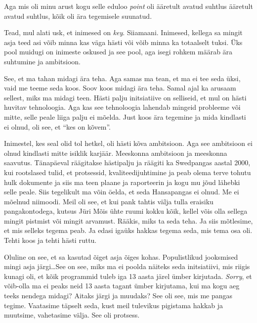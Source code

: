 Aga mis oli minu arust kogu selle eduloo \emph{point} oli ääretult avatud suhtlus ääretult avatud suhtlus, kõik oli  ära tegemisele suunatud. 


Tead, mul alati usk, et inimesed on \emph{key}. Siiamaani. Inimesed, kellega sa mingit asja teed asi võib minna kas väga hästi või võib minna ka totaalselt tuksi. Üks pool muidugi on inimeste oskused ja see pool, aga isegi rohkem määrab ära suhtumine ja ambitsioon. 


See, et ma tahan midagi ära teha. Aga samas ma tean, et ma ei tee seda üksi, vaid me teeme seda koos. Soov koos midagi ära teha. Samal ajal ka arusaam sellest, miks ma midagi teen. Hästi palju initsiatiive on selliseid, et mul on  hästi huvitav tehnoloogia. Aga kas see tehnoloogia lahendab mingeid probleeme või mitte, selle peale liiga palju ei mõelda. Just  koos ära tegemine ja mida kindlasti ei olnud, oli see, et \enquote{kes on kõvem}.

Inimestel, kes seal olid tol hetkel, oli hästi kõva ambitsioon. Aga see ambitsioon ei olnud kindlasti mitte isiklik karjäär.  Meeskonna ambitsioon ja meeskonna saavutus. Tänapäeval räägitakse hästipalju ja räägiti ka Swedpangas aastal 2000, kui rootslased tulid, et protsessid, kvaliteedijuhtimine ja peab olema terve tohutu hulk dokumente ja siis ma teen plaane ja  raporteerin ja kogu mu jõud lähebki  selle peale. Siis tegelikult ma võin öelda, et seda Hansapangas ei olnud. Me ei mõelnud niimoodi. Meil oli see, et kui pank tahtis välja tulla eraisiku pangakontodega, kutsus Jüri Mõis ühte ruumi kokku kõik, kellel võis olla sellega mingit pistmist või mingit arvamust. Rääkis, miks ta seda teha. Ja siis mõtlesime, et mis selleks tegema peab. Ja edasi igaüks hakkas tegema seda, mis tema osa oli. Tehti koos ja tehti hästi ruttu. 


Oluline on see, et sa kasutad õiget asja õiges kohas. Populistlikud jooksmised mingi asja järgi\ldots See on see, miks ma ei poolda näiteks seda initsiatiivi, mis riigis  kunagi oli, et kõik programmid tuleb iga 13 aasta järel ümber kirjutada. \emph{Sorry}, et võib-olla ma ei peaks neid 13 aasta tagant ümber kirjutama, kui ma kogu aeg teeks nendega midagi? Aitaks järgi ja muudaks? See oli see, mis me pangas tegime. Vaatasime täpselt seda,  kust meil tulevikus pigistama hakkab ja muutsime, vahetasime välja. See oli protsess. 

